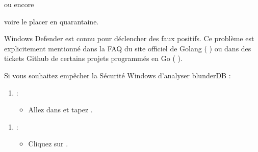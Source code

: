 \documentclass[letterpaper,10pt,french]{sphinxmanual}
\begin{document}
\sphinxAtStartPar
ou encore

\begin{figure}[htbp]
\centering

\noindent{}
\end{figure}

\sphinxAtStartPar
voire le placer en quarantaine.

\sphinxAtStartPar
Windows Defender est connu pour déclencher des faux positifs. Ce problème est
explicitement mentionné dans la FAQ du site officiel de Golang (
 ) ou dans des tickets Github de certains projets
programmés en Go (  ).

\sphinxAtStartPar
Si vous souhaitez empêcher la Sécurité Windows d’analyser blunderDB :
\begin{enumerate}
%
\item {} 
\sphinxAtStartPar
{} :
\begin{itemize}
\item {} 
\sphinxAtStartPar
Allez dans  et tapez .

\end{itemize}

\end{enumerate}

\begin{figure}[htbp]
\centering

\noindent{}
\end{figure}
\begin{enumerate}
%
\setcounter{enumi}{1}
\item {} 
\sphinxAtStartPar
{} :
\begin{itemize}
\item {} 
\sphinxAtStartPar
Cliquez sur .

\end{itemize}

\end{enumerate}
\end{document}
